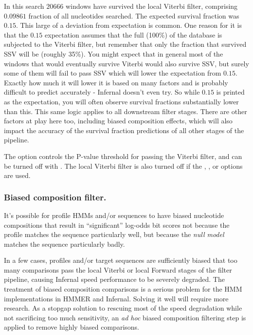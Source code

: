 In this search $20666$ windows have survived the local Viterbi filter,
comprising $0.09861$ fraction of all nucleotides searched. The
expected survival fraction was $0.15$. This large of a deviation from
expectation is common. One reason for it is that the $0.15$
expectation assumes that the full (100\%) of the database is subjected
to the Viterbi filter, but remember that only the fraction that
survived SSV will be (roughly 35\%). You might expect that in general
most of the windows that would eventually survive Viterbi would also
survive SSV, but surely some of them will fail to pass SSV which will
lower the expectation from $0.15$. Exactly how much it will lower it
is based on many factors and is probably difficult to predict
accurately - Infernal doesn't even try. So while $0.15$ is printed as
the expectation, you will often observe survival fractions
substantially lower than this. This same logic applies to all
downstream filter stages. There are other factors at play here too,
including biased composition effects, which will also impact the
accuracy of the survival fraction predictions of all other stages of
the pipeline.

The  option controls the P-value threshold for passing
the Viterbi filter, and can be turned off with .  The
local Viterbi filter is also turned off if the ,
, or  options are used.

\subsubsection{Biased composition filter.}

It's possible for profile HMMs and/or sequences to have biased nucleotide
compositions that result in ``significant'' log-odds bit scores not
because the profile matches the sequence particularly well, but
because the \emph{null model} matches the sequence particularly badly.

In a few cases, profiles and/or target sequences are sufficiently
biased that too many comparisons pass the local Viterbi or local
Forward stages of the filter pipeline, causing Infernal speed
performance to be severely degraded.  The treatment of biased
composition comparisons is a serious problem for the HMM
implementations in HMMER and Infernal. Solving it well will require
more research. As a stopgap solution to rescuing most of the speed
degradation while not sacrificing too much sensitivity, an \emph{ad
hoc} biased composition filtering step is applied to remove highly
biased comparisons.

